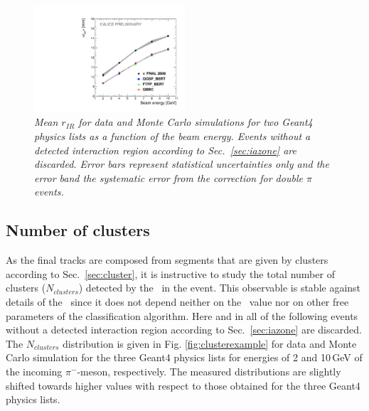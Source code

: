 \begin{figure}[H]
	\centering
	\includegraphics[width=0.5\textwidth]{ECAL/plots/r-ir-graph.pdf}
	\caption{\label{fig:irrgraph} \sl Mean $r_{IR}$ for data and Monte Carlo simulations for two {\sc Geant}4 physics lists as a function of the beam energy. Events without a detected interaction region according to Sec.~\ref{sec:iazone} are discarded. Error bars represent statistical uncertainties only and the error band the systematic error from the correction for double $\pi$ events.}
\end{figure}

\subsection{Number of clusters}
As the final tracks are composed from segments that are given by clusters according to Sec.~\ref{sec:cluster}, it is instructive to study the total number of clusters ($N_{clusters}$) detected by the \tfa\ in the event. This observable is stable against details of the \tfa\,
since it does not depend neither on the \ep\ value nor on other free parameters of the classification algorithm. Here and in all of the following events without a detected interaction region according to Sec.~\ref{sec:iazone} are discarded.
The $N_{clusters}$ distribution is given in Fig. \ref{fig:clusterexample} for data and Monte Carlo simulation for the three {\sc Geant4} physics lists for energies of 2 and 10\,GeV of the incoming $\pi^-$-meson, respectively. The measured distributions are slightly shifted towards higher values with respect to those obtained for the three {\sc Geant4} physics lists.

